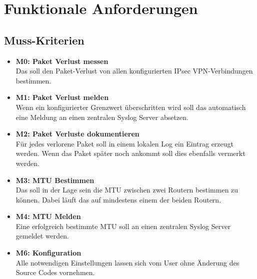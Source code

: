 \section{Funktionale Anforderungen}
\label{sec:Funktionale Anforderungen}

\subsection{Muss-Kriterien}

\begin{itemize}

\item \textbf{M0: Paket Verlust messen} \\
Das \tool{} soll den Paket-Verlust von allen konfigurierten \ac{IPsec} \ac{VPN}-Verbindungen bestimmen.

\item \textbf{M1: Paket Verlust melden} \\
Wenn ein konfigurierter Grenzwert überschritten wird soll das \tool{} automatisch eine Meldung an einen zentralen Syslog Server absetzen.

\item \textbf{M2: Paket Verluste dokumentieren} \\
Für jedes verlorene Paket soll in einem lokalen Log ein Eintrag erzeugt werden. Wenn das Paket später noch ankommt soll dies ebenfalls vermerkt werden.

\item \textbf{M3: MTU Bestimmen} \\
Das \tool{} soll in der Lage sein die \ac{MTU} zwischen zwei Routern bestimmen zu können. Dabei läuft das \tool{} auf mindestens einem der beiden Routern.

\item \textbf{M4: MTU Melden} \\
Eine erfolgreich bestimmte \ac{MTU} soll an einen zentralen Syslog Server gemeldet werden.

\item \textbf{M6: Konfiguration} \\
Alle notwendigen Einstellungen lassen sich vom User ohne Änderung des Source Codes vornehmen.

\end{itemize}

